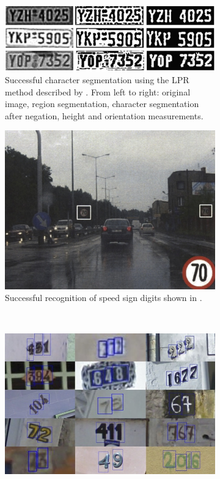 \begin{figure}
  \centering
  \begin{subfigure}[b]{0.45\textwidth}
    \includegraphics[width=\textwidth]{images/introduction/lpr}
    \caption{Successful character segmentation using the LPR method described by \citet{Anagnostopoulos:2006wv}. From left to right: original image, region segmentation, character segmentation after negation, height and orientation measurements.}
  \end{subfigure}
  \hspace{0.05\textwidth}
  \begin{subfigure}[b]{0.45\textwidth}
    \includegraphics[width=\textwidth]{images/introduction/tsr}
    \caption{Successful recognition of speed sign digits shown in \citet{Eichner:2008dw}.}
  \end{subfigure}\\
  \vspace{1cm}
  \begin{subfigure}[b]{0.45\textwidth}
    \includegraphics[width=\textwidth]{images/introduction/streetview}

\end{subfigure}
\end{figure}
